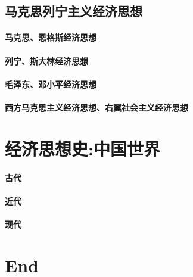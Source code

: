 \documentclass[UTF8]{../../RepresentationUniverse}
\begin{document}
\section{马克思列宁主义经济思想}
    \subsubsection{马克思、恩格斯经济思想}
    \subsubsection{列宁、斯大林经济思想}
    \subsubsection{毛泽东、邓小平经济思想}
    \subsubsection{西方马克思主义经济思想、右翼社会主义经济思想}



\chapter{经济思想史:中国世界}
\subsubsection{古代}
\subsubsection{近代}
\subsubsection{现代}





\chapter{End}
\end{document}
